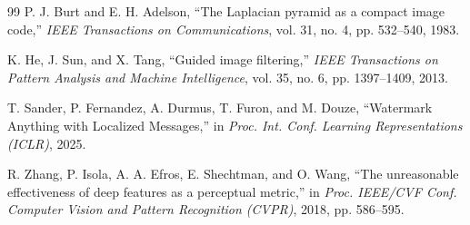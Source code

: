 \documentclass[conference,10pt]{IEEEtran}
\begin{document}
\begin{thebibliography}{99}
P. J. Burt and E. H. Adelson, ``The Laplacian pyramid as a compact image code,'' \emph{IEEE Transactions on Communications}, vol. 31, no. 4, pp. 532--540, 1983.

K. He, J. Sun, and X. Tang, ``Guided image filtering,'' \emph{IEEE Transactions on Pattern Analysis and Machine Intelligence}, vol. 35, no. 6, pp. 1397--1409, 2013.

T. Sander, P. Fernandez, A. Durmus, T. Furon, and M. Douze, ``Watermark Anything with Localized Messages,'' in \emph{Proc. Int. Conf. Learning Representations (ICLR)}, 2025.

R. Zhang, P. Isola, A. A. Efros, E. Shechtman, and O. Wang, ``The unreasonable effectiveness of deep features as a perceptual metric,'' in \emph{Proc. IEEE/CVF Conf. Computer Vision and Pattern Recognition (CVPR)}, 2018, pp. 586--595.
\end{thebibliography}
\end{document}
